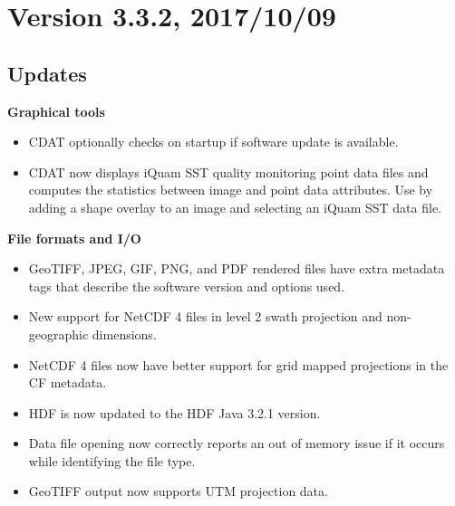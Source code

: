 
\section*{Version 3.3.2, 2017/10/09}

\subsection*{ Updates}

\hspace{0.4cm} {\bf Graphical tools}

\begin{itemize}

  \item CDAT optionally checks on startup if software update is available.

  \item CDAT now displays iQuam SST quality monitoring point data files and
  computes the statistics between image and point data attributes.  Use
  by adding a shape overlay to an image and selecting an iQuam SST data file.

\end{itemize}

\hspace{0.4cm} {\bf File formats and I/O}

\begin{itemize}

  \item GeoTIFF, JPEG, GIF, PNG, and PDF rendered files have extra metadata tags
  that describe the software version and options used.

  \item New support for NetCDF 4 files in level 2 swath projection and
  non-geographic dimensions.

  \item NetCDF 4 files now have better support for grid mapped projections in
  the CF metadata.

  \item HDF is now updated to the HDF Java 3.2.1 version.

  \item Data file opening now correctly reports an out of memory issue if it
  occurs while identifying the file type.

  \item GeoTIFF output now supports UTM projection data.

\end{itemize}

